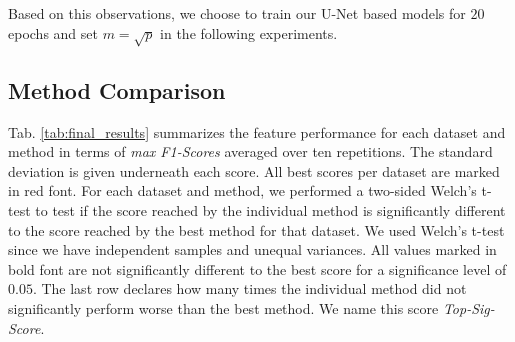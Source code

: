 Based on this observations, we choose to train our U-Net based models for $20$ epochs and set $m=\sqrt{p}$ in the following experiments.
\vspace{20pt}

\subsection{Method Comparison}
Tab. \ref{tab:final_results} summarizes the feature performance for each dataset and method in terms of \textit{max F1-Scores} averaged over ten repetitions. The standard deviation is given underneath each score. All best scores per dataset are marked in red font. For each dataset and method, we performed a two-sided Welch's t-test \cite{Welch1947} to test if the score reached by the individual method is significantly different to the score reached by the best method for that dataset. We used Welch's t-test since we have independent samples and unequal variances. All values marked in bold font are not significantly different to the best score for a significance level of $0.05$. The last row declares how many times the individual method did not significantly perform worse than the best method. We name this score \textit{Top-Sig-Score}.

